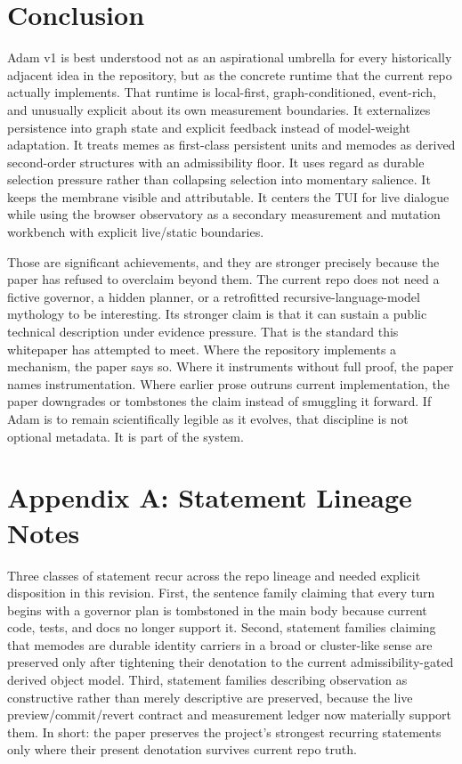 \documentclass[10pt]{article}
\begin{document}
\section{Conclusion}

Adam v1 is best understood not as an aspirational umbrella for every historically adjacent idea in the repository, but as the concrete runtime that the current repo actually implements. That runtime is local-first, graph-conditioned, event-rich, and unusually explicit about its own measurement boundaries. It externalizes persistence into graph state and explicit feedback instead of model-weight adaptation. It treats memes as first-class persistent units and memodes as derived second-order structures with an admissibility floor. It uses regard as durable selection pressure rather than collapsing selection into momentary salience. It keeps the membrane visible and attributable. It centers the TUI for live dialogue while using the browser observatory as a secondary measurement and mutation workbench with explicit live/static boundaries.

Those are significant achievements, and they are stronger precisely because the paper has refused to overclaim beyond them. The current repo does not need a fictive governor, a hidden planner, or a retrofitted recursive-language-model mythology to be interesting. Its stronger claim is that it can sustain a public technical description under evidence pressure. That is the standard this whitepaper has attempted to meet. Where the repository implements a mechanism, the paper says so. Where it instruments without full proof, the paper names instrumentation. Where earlier prose outruns current implementation, the paper downgrades or tombstones the claim instead of smuggling it forward. If Adam is to remain scientifically legible as it evolves, that discipline is not optional metadata. It is part of the system.

\appendix

\section{Appendix A: Statement Lineage Notes}

Three classes of statement recur across the repo lineage and needed explicit disposition in this revision. First, the sentence family claiming that every turn begins with a governor plan is tombstoned in the main body because current code, tests, and docs no longer support it. Second, statement families claiming that memodes are durable identity carriers in a broad or cluster-like sense are preserved only after tightening their denotation to the current admissibility-gated derived object model. Third, statement families describing observation as constructive rather than merely descriptive are preserved, because the live preview/commit/revert contract and measurement ledger now materially support them. In short: the paper preserves the project's strongest recurring statements only where their present denotation survives current repo truth.
\end{document}
